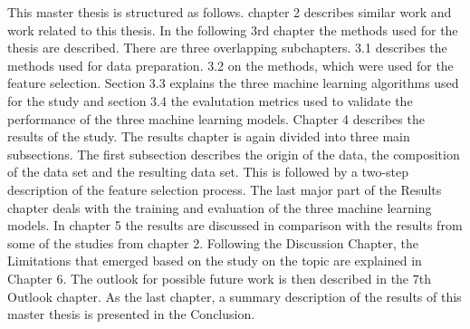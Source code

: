\documentclass[../masterarbeit.tex]{subfiles}
\begin{document}
This master thesis is structured as follows. chapter 2 describes similar work and work related to this thesis. In the following 3rd chapter the methods used for the thesis are described. There are three overlapping subchapters. 3.1 describes the methods used for data preparation. 3.2 on the methods, which were used for the feature selection. Section 3.3 explains the three machine learning algorithms used for the study and section 3.4 the evalutation metrics used to validate the performance of the three machine learning models.
Chapter 4 describes the results of the study. The results chapter is again divided into three main subsections. The first subsection describes the origin of the data, the composition of the data set and the resulting data set. This is followed by a two-step description of the feature selection process. The last major part of the Results chapter deals with the training and evaluation of the three machine learning models. 
In chapter 5 the results are discussed in comparison with the results from some of the studies from chapter 2. Following the Discussion Chapter, the Limitations that emerged based on the study on the topic are explained in Chapter 6. The outlook for possible future work is then described in the 7th Outlook chapter. As the last chapter, a summary description of the results of this master thesis is presented in the Conclusion. 
\end{document}

